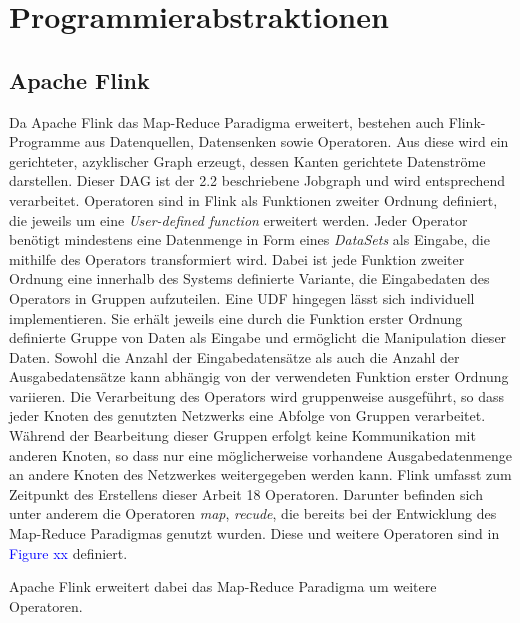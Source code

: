
\section{Programmierabstraktionen}
\subsection{Apache Flink}
Da Apache Flink das Map-Reduce Paradigma erweitert, bestehen auch Flink-Programme aus Datenquellen, Datensenken sowie Operatoren. Aus diese wird ein gerichteter, azyklischer Graph erzeugt, dessen Kanten gerichtete Datenströme darstellen. Dieser DAG ist der 2.2 beschriebene Jobgraph und wird entsprechend verarbeitet. Operatoren sind in Flink als Funktionen zweiter Ordnung definiert, die jeweils um eine \textit{User-defined function} erweitert werden. Jeder Operator benötigt mindestens eine Datenmenge in Form eines \textit{DataSets} als Eingabe, die mithilfe des Operators transformiert wird. Dabei ist jede Funktion zweiter Ordnung eine innerhalb des Systems definierte Variante, die Eingabedaten des Operators in Gruppen aufzuteilen. Eine UDF hingegen lässt sich individuell implementieren. Sie erhält jeweils eine durch die Funktion erster Ordnung definierte Gruppe von Daten als Eingabe und ermöglicht die Manipulation dieser Daten. Sowohl die Anzahl der Eingabedatensätze als auch die Anzahl der Ausgabedatensätze kann abhängig von der verwendeten Funktion erster Ordnung variieren. Die Verarbeitung des Operators wird gruppenweise ausgeführt, so dass jeder Knoten des genutzten Netzwerks eine Abfolge von Gruppen verarbeitet. Während der Bearbeitung dieser Gruppen erfolgt keine Kommunikation mit anderen Knoten, so dass nur eine möglicherweise vorhandene Ausgabedatenmenge an andere Knoten des Netzwerkes weitergegeben werden kann.
Flink umfasst zum Zeitpunkt des Erstellens dieser Arbeit 18 Operatoren. Darunter befinden sich unter anderem die Operatoren \textit{map}, \textit{recude}, die bereits bei der Entwicklung des Map-Reduce Paradigmas genutzt wurden. Diese und weitere Operatoren sind in \textcolor{blue}{Figure xx} definiert. 

Apache Flink erweitert dabei das Map-Reduce Paradigma um weitere Operatoren. 

